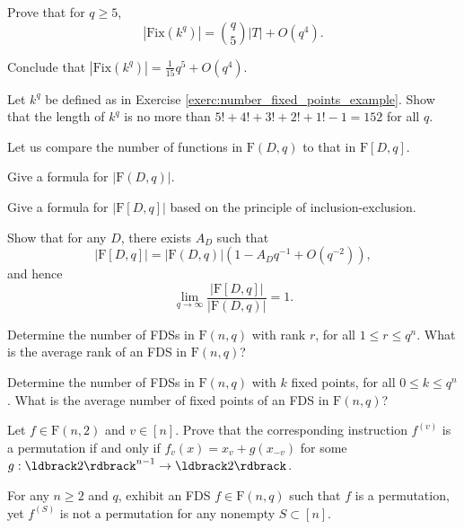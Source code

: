 \documentclass[a4paper, 11pt]{book}
\numberwithin{equation}{section}
\theoremstyle{plain}
\newcommand{\functions}{\mathrm{F}}
\newcommand{\Fix}{\mathrm{Fix}}
\renewcommand{\(}{\ldbrack}
\renewcommand{\)}{\rdbrack}
\begin{document}
\begin{exercises}
\begin{exercises}
	\item Prove that for $q \ge 5$,
	\[
		|\Fix(k^q)| = \binom{q}{5} |T| + O(q^4).
	\]
	
	\item Conclude that $|\Fix(k^q)| = \frac{1}{15} q^5 + O(q^4).$
\end{exercises}

\item Let $k^q$ be defined as in Exercise \ref{exerc:number_fixed_points_example}. Show that the length of $k^q$ is no more than $5! + 4! + 3! + 2! + 1! - 1 = 152$ for all $q$.







\item Let us compare the number of functions in $\functions(D,q)$ to that in $\functions[D,q]$.
\begin{exercises}
	\item Give a formula for $|\functions(D,q)|$.
	
	\item Give a formula for $|\functions[D,q]|$ based on the principle of inclusion-exclusion.
	
	\item Show that for any $D$, there exists $A_D$ such that
	\[
		|\functions[D, q]| = |\functions(D, q)| \left( 1 - A_D q^{-1} + O(q^{-2}) \right),
	\]
	and hence
	\[
		\lim_{q \to \infty} \frac{|\functions[D, q]|}{|\functions(D, q)|} = 1.
	\]
\end{exercises}

\item Determine the number of FDSs in $\functions(n, q)$ with rank $r$, for all $1 \le r \le q^n$. What is the average rank of an FDS in $\functions(n, q)$?

\item \label{exerc:number_FDS_k_with_fixed_points} Determine the number of FDSs in $\functions(n, q)$ with $k$ fixed points, for all $0 \le k \le q^n$. What is the average number of fixed points of an FDS in $\functions(n, q)$?


\item Let $f \in \functions(n,2)$ and $v \in [n]$. Prove that the corresponding instruction $f^{(v)}$ is a permutation if and only if $f_v(x) = x_v + g(x_{- v})$ for some $g : \(2\)^{n-1} \to \(2\)$.

\item For any $n \ge 2$ and $q$, exhibit an FDS $f \in \functions(n,q)$ such that $f$ is a permutation, yet $f^{(S)}$ is not a permutation for any nonempty $S \subset [n]$.


\end{exercises}
\end{document}

